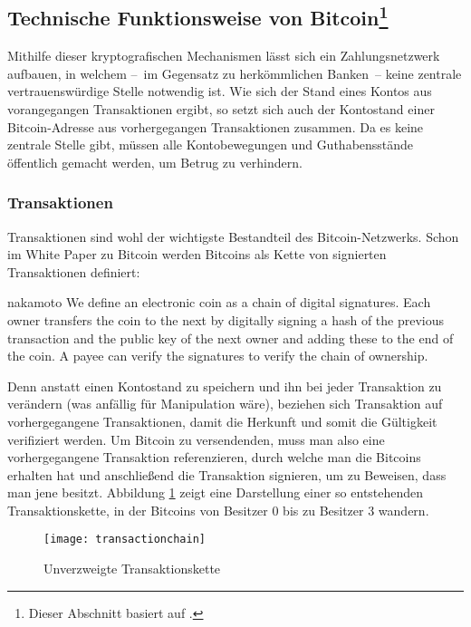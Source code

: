 \subsection[Technische Funktionsweise von Bitcoin]{Technische Funktionsweise von Bitcoin\footnote{Dieser Abschnitt basiert auf \cite{nielsen}.}}
\label{sec:mechanics}

Mithilfe dieser kryptografischen Mechanismen lässt sich ein Zahlungsnetzwerk aufbauen, in welchem --~im Gegensatz zu herkömmlichen Banken~-- keine zentrale vertrauenswürdige Stelle notwendig ist.
Wie sich der Stand eines Kontos aus vorangegangen Transaktionen ergibt, so setzt sich auch der Kontostand einer Bitcoin-Adresse aus vorhergegangen Transaktionen zusammen.
Da es keine zentrale Stelle gibt, müssen alle Kontobewegungen und Guthabensstände öffentlich gemacht werden, um Betrug zu verhindern.

\subsubsection{Transaktionen}

Transaktionen sind wohl der wichtigste Bestandteil des Bitcoin-Netzwerks.
Schon im White Paper zu Bitcoin werden Bitcoins als Kette von signierten Transaktionen definiert:

\begin{longquote}[2]{nakamoto}
We define an electronic coin as a chain of digital signatures. Each owner transfers the coin to the next by digitally signing a hash of the previous transaction and the public key of the next owner and adding these to the end of the coin. A payee can verify the signatures to verify the chain of ownership.
\end{longquote}

Denn anstatt einen Kontostand zu speichern und ihn bei jeder Transaktion zu verändern (was anfällig für Manipulation wäre), beziehen sich Transaktion auf vorhergegangene Transaktionen, damit die Herkunft und somit die Gültigkeit verifiziert werden.
Um Bitcoin zu versendenden, muss man also eine vorhergegangene Transaktion referenzieren, durch welche man die Bitcoins erhalten hat und anschließend die Transaktion signieren, um zu Beweisen, dass man jene besitzt.
Abbildung \ref{fig:transactionchain} zeigt eine Darstellung einer so entstehenden Transaktionskette, in der Bitcoins von Besitzer 0 bis zu Besitzer 3 wandern.

\begin{figure}[htb]
    \begin{center}
        \texttt{[image: transactionchain]}
        \caption{Unverzweigte Transaktionskette \parencite[2]{nakamoto}}
        \label{fig:transactionchain}
    \end{center}
\end{figure}

